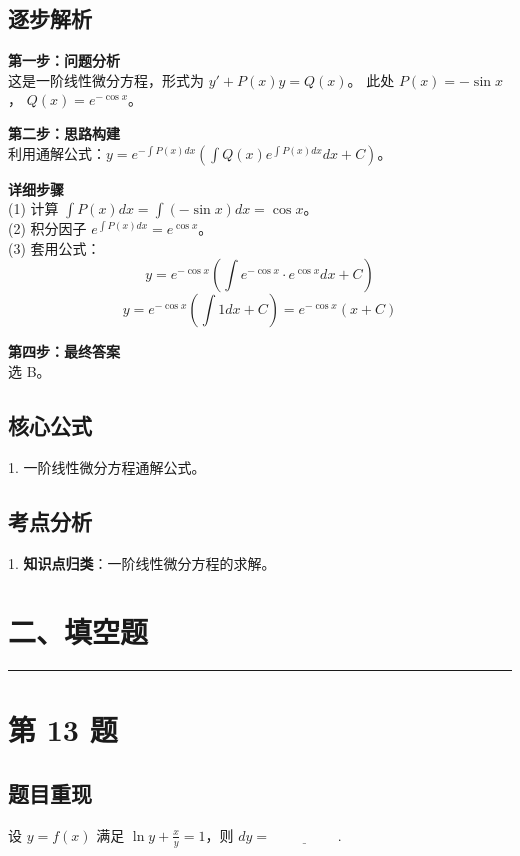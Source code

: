 \documentclass[10pt, a4paper]{ctexart}
\newcommand{\problemheader}{
    \vspace{0.5cm}
    \noindent\rule[0.5ex]{\linewidth}{2pt} %
}
\newcommand{\analysisheader}{
    \vspace{0.2cm}
    \noindent{\color{red}\rule[0.5ex]{\linewidth}{0.5pt}} %
    \vspace{0.1cm}
}
\begin{document}
\analysisheader
{\color{red}
\subsection*{逐步解析}
\textbf{第一步：问题分析} \\
这是一阶线性微分方程，形式为 $y' + P(x)y = Q(x)$。
此处 $P(x) = -\sin x$， $Q(x) = e^{-\cos x}$。

\textbf{第二步：思路构建} \\
利用通解公式：$y = e^{-\int P(x)dx} \left( \int Q(x) e^{\int P(x)dx} dx + C \right)$。

\textbf{详细步骤} \\
(1) 计算 $\int P(x) dx = \int (-\sin x) dx = \cos x$。 \\
(2) 积分因子 $e^{\int P(x) dx} = e^{\cos x}$。 \\
(3) 套用公式：
\[ y = e^{-\cos x} \left( \int e^{-\cos x} \cdot e^{\cos x} dx + C \right) \]
\[ y = e^{-\cos x} \left( \int 1 dx + C \right) = e^{-\cos x} (x + C) \]

\textbf{第四步：最终答案} \\
选 B。

\subsection*{核心公式}
1. 一阶线性微分方程通解公式。

\subsection*{考点分析}
1. \textbf{知识点归类}：一阶线性微分方程的求解。
}


\section*{二、填空题}

\problemheader
\section*{第 13 题}
\subsection*{题目重现}
设 $y = f(x)$ 满足 $\ln y + \frac{x}{y} = 1$，则 $dy = \underline{\hspace{2cm}}$.
\end{document}
